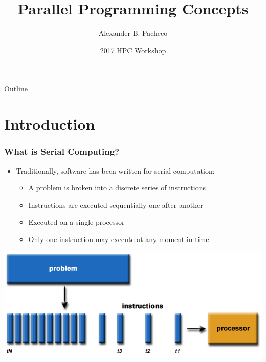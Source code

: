 \documentclass[10pt,t]{beamer}
\title{Parallel Programming Concepts}
\subtitle{}
\author{Alexander B. Pacheco}
\institute{\href{http://researchcomputing.lehigh.edu}{LTS Research Computing}}
\date{2017 HPC Workshop}
\begin{document}
\begin{frame}
  \titlepage
\end{frame}

\begin{frame}[c]{Outline}
  \tableofcontents
\end{frame}

\section{Introduction}
\begin{frame}
  \frametitle{What is Serial Computing?}
  \begin{itemize}
  \item Traditionally, software has been written for serial computation:
    \begin{itemize}
    \item A problem is broken into a discrete series of instructions
    \item Instructions are executed sequentially one after another
    \item Executed on a single processor
    \item Only one instruction may execute at any moment in time
    \end{itemize}
  \end{itemize}
  \includegraphics[width=\textwidth]{./serialProblem}
\end{frame}
\end{document}
